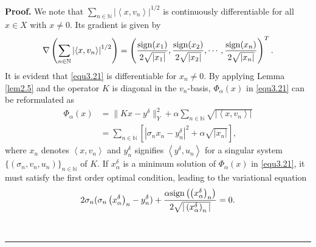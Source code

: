 \documentclass[a4paper,12pt]{article}
\numberwithin{equation}{section}
\newenvironment{proof}[1][Proof]{\textbf{#1.} }
{\ \rule{0.75em}{0.75em}\smallskip}
\begin{document}
\begin{proof}
    We note that $\sum_{n\in\mathbb{N}}\left|\left<x,v_{n}\right>\right|^{1/2}$ is continuously differentiable for all $x\in X$ with $x\neq 0$. Its gradient is given by
    \begin{equation*}
        \nabla\left(\sum_{n\in\mathbb{N}}\left|\left<x,v_{n}\right>\right|^{1/2}\right)= \left(\frac{{\rm sign} (x_{1})}{2\sqrt{|x_{1}|}}, \frac{{\rm sign} (x_{2})}{2\sqrt{|x_{2}|}}, \cdots, \frac{{\rm sign} (x_{n})}{2\sqrt{|x_{n}|}}\right)^{T}.
    \end{equation*}
    It is evident that \eqref{equ3.21} is differentiable for $x_{n}\neq 0$. By applying Lemma \ref{lem2.5} and the operator $K$ is diagonal in the $v_{n}$-basis, $\Phi_{\alpha}\left(x\right)$ in \eqref{equ3.21} can be reformulated as
    \begin{align*}
        \Phi_{\alpha}(x)
        & =\|Kx-y^{\delta}\|_{Y}^{2}+\alpha\sum_{n\in\mathbb{N}} \sqrt{|\left<x,v_{n}\right>|} \nonumber\\
        & =\sum_{n\in\mathbb{N}}\left[|\sigma_{n}x_{n}-y^{\delta}_{n}|^{2} +\alpha\sqrt{|x_{n}|}\right],
    \end{align*}
     where $x_{n}$ denotes $\left<x,v_{n}\right>$ and $y^{\delta}_{n}$ signifies $\left<y^{\delta},u_{n}\right>$ for a singular system $\{(\sigma_{n},v_{n},u_{n})\}_{n\in\mathbb{N}}$ of $K$. If $x_{\alpha}^{\delta}$ is a minimum solution of $\Phi_{\alpha}\left(x\right)$ in \eqref{equ3.21}, it must satisfy the first order optimal condition, leading to the variational equation
    \begin{equation}\label{equ3.25}
        2\sigma_{n}(\sigma_{n}\left(x_{\alpha}^{\delta}\right)_{n}-y^{\delta}_{n})+\frac{\alpha {\rm sign} \left(\left(x_{\alpha}^{\delta}\right)_{n}\right)} {2\sqrt{|\left(x_{\alpha}^{\delta}\right)_{n}|}}=0.
    \end{equation}
    

\end{proof}
\end{document}

